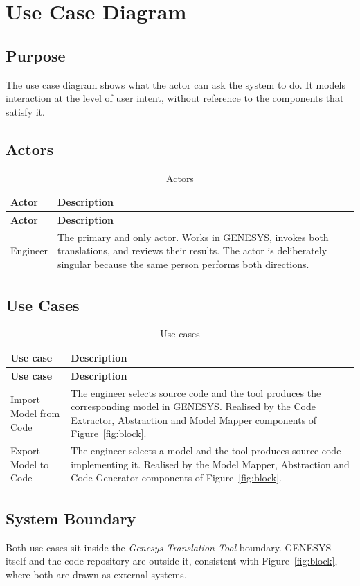 \chapter{Use Case Diagram}
\label{ch:usecase}

\section{Purpose}

The use case diagram shows what the actor can ask the system to do. It models
interaction at the level of user intent, without reference to the components
that satisfy it.


\section{Actors}

\begin{longtable}{L{0.20\textwidth}L{0.72\textwidth}}
	\caption{Actors}\label{tab:actors}\\
	\toprule
	\textbf{Actor} & \textbf{Description} \\
	\midrule
	\endfirsthead
	\toprule
	\textbf{Actor} & \textbf{Description} \\
	\midrule
	\endhead
	Engineer & The primary and only actor. Works in GENESYS, invokes both
	translations, and reviews their results. The actor is deliberately singular
	because the same person performs both directions. \\
	\bottomrule
\end{longtable}

\section{Use Cases}

\begin{longtable}{L{0.26\textwidth}L{0.66\textwidth}}
	\caption{Use cases}\label{tab:usecases}\\
	\toprule
	\textbf{Use case} & \textbf{Description} \\
	\midrule
	\endfirsthead
	\toprule
	\textbf{Use case} & \textbf{Description} \\
	\midrule
	\endhead

	Import Model from Code & The engineer selects source code and the tool
	produces the corresponding model in GENESYS. Realised by the Code Extractor,
	Abstraction and Model Mapper components of Figure~\ref{fig:block}. \\
	\addlinespace

	Export Model to Code & The engineer selects a model and the tool produces
	source code implementing it. Realised by the Model Mapper, Abstraction and Code
	Generator components of Figure~\ref{fig:block}. \\
	\bottomrule
\end{longtable}

\section{System Boundary}

Both use cases sit inside the \emph{Genesys Translation Tool} boundary. GENESYS
itself and the code repository are outside it, consistent with
Figure~\ref{fig:block}, where both are drawn as external systems.